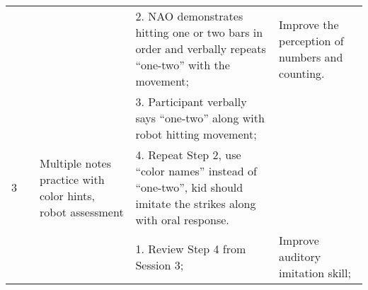 \begin{sidewaystable}[tbp]
\begin{center}
{\begin{tabular}{cccll}
	{\color[HTML]{666666} }                    & {\color[HTML]{666666} }                                          & \multicolumn{1}{l}{{\color[HTML]{666666} }}                                                                                                           & {\color[HTML]{666666} 2. NAO demonstrates hitting   one or two bars in order and verbally repeats “one-two” with the movement;}                                                      & {\color[HTML]{666666} Improve the perception of numbers and counting.}                                                                                                 \\
	{\color[HTML]{666666} }                    & {\color[HTML]{666666} }                                          & \multicolumn{1}{l}{{\color[HTML]{666666} }}                                                                                                           & {\color[HTML]{666666} 3. Participant verbally says   “one-two” along with robot hitting movement;}                                                                                   &                                                                                                                                                                        \\
	\multirow{-4}{*}{{\color[HTML]{666666} 3}} & {\color[HTML]{666666} }                                          & \multicolumn{1}{l}{\multirow{-4}{*}{{\color[HTML]{666666} Multiple notes practice with color hints, robot assessment}}}                               & {\color[HTML]{666666} 4. Repeat Step 2, use “color   names” instead of “one-two”, kid should imitate the strikes along with oral   response.}                                        &                                                                                                                                                                        \\
	{\color[HTML]{666666} }                    & {\color[HTML]{666666} }                                          & {\color[HTML]{666666} }                                                                                                                               & {\color[HTML]{666666} 1. Review Step 4   from Session 3;}                                                                                                                            & {\color[HTML]{666666} Improve auditory   imitation skill;}                                                                                                             \\

\end{tabular}}
\end{center}
\end{sidewaystable}
